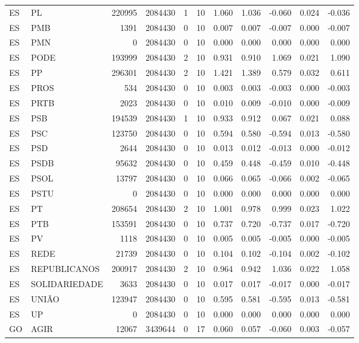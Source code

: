 \begin{landscape}
\begin{longtable}{llrrrrrrrrr}
ES & PL & 220995 & 2084430 & 1 & 10 & 1.060 & 1.036 & -0.060 & 0.024 & -0.036 \\
ES & PMB & 1391 & 2084430 & 0 & 10 & 0.007 & 0.007 & -0.007 & 0.000 & -0.007 \\
ES & PMN & 0 & 2084430 & 0 & 10 & 0.000 & 0.000 & 0.000 & 0.000 & 0.000 \\
ES & PODE & 193999 & 2084430 & 2 & 10 & 0.931 & 0.910 & 1.069 & 0.021 & 1.090 \\
ES & PP & 296301 & 2084430 & 2 & 10 & 1.421 & 1.389 & 0.579 & 0.032 & 0.611 \\
ES & PROS & 534 & 2084430 & 0 & 10 & 0.003 & 0.003 & -0.003 & 0.000 & -0.003 \\
ES & PRTB & 2023 & 2084430 & 0 & 10 & 0.010 & 0.009 & -0.010 & 0.000 & -0.009 \\
ES & PSB & 194539 & 2084430 & 1 & 10 & 0.933 & 0.912 & 0.067 & 0.021 & 0.088 \\
ES & PSC & 123750 & 2084430 & 0 & 10 & 0.594 & 0.580 & -0.594 & 0.013 & -0.580 \\
ES & PSD & 2644 & 2084430 & 0 & 10 & 0.013 & 0.012 & -0.013 & 0.000 & -0.012 \\
ES & PSDB & 95632 & 2084430 & 0 & 10 & 0.459 & 0.448 & -0.459 & 0.010 & -0.448 \\
ES & PSOL & 13797 & 2084430 & 0 & 10 & 0.066 & 0.065 & -0.066 & 0.002 & -0.065 \\
ES & PSTU & 0 & 2084430 & 0 & 10 & 0.000 & 0.000 & 0.000 & 0.000 & 0.000 \\
ES & PT & 208654 & 2084430 & 2 & 10 & 1.001 & 0.978 & 0.999 & 0.023 & 1.022 \\
ES & PTB & 153591 & 2084430 & 0 & 10 & 0.737 & 0.720 & -0.737 & 0.017 & -0.720 \\
ES & PV & 1118 & 2084430 & 0 & 10 & 0.005 & 0.005 & -0.005 & 0.000 & -0.005 \\
ES & REDE & 21739 & 2084430 & 0 & 10 & 0.104 & 0.102 & -0.104 & 0.002 & -0.102 \\
ES & REPUBLICANOS & 200917 & 2084430 & 2 & 10 & 0.964 & 0.942 & 1.036 & 0.022 & 1.058 \\
ES & SOLIDARIEDADE & 3633 & 2084430 & 0 & 10 & 0.017 & 0.017 & -0.017 & 0.000 & -0.017 \\
ES & UNIÃO & 123947 & 2084430 & 0 & 10 & 0.595 & 0.581 & -0.595 & 0.013 & -0.581 \\
ES & UP & 0 & 2084430 & 0 & 10 & 0.000 & 0.000 & 0.000 & 0.000 & 0.000 \\
GO & AGIR & 12067 & 3439644 & 0 & 17 & 0.060 & 0.057 & -0.060 & 0.003 & -0.057 \\

\end{longtable}
\end{landscape}
